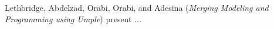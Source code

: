 

Lethbridge, Abdelzad, Orabi, Orabi, and Adesina
\cite{isola-2016-lethbridge}
({\em Merging Modeling and Programming using Umple})
present ...


